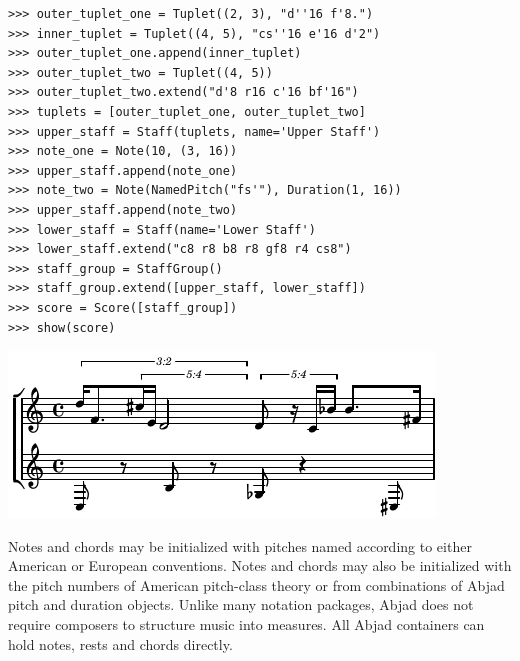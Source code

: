 \documentclass{article}
\begin{document}

\begin{lstlisting}
>>> outer_tuplet_one = Tuplet((2, 3), "d''16 f'8.")
>>> inner_tuplet = Tuplet((4, 5), "cs''16 e'16 d'2")
>>> outer_tuplet_one.append(inner_tuplet)
>>> outer_tuplet_two = Tuplet((4, 5))
>>> outer_tuplet_two.extend("d'8 r16 c'16 bf'16")
>>> tuplets = [outer_tuplet_one, outer_tuplet_two]
>>> upper_staff = Staff(tuplets, name='Upper Staff')
>>> note_one = Note(10, (3, 16))
>>> upper_staff.append(note_one)
>>> note_two = Note(NamedPitch("fs'"), Duration(1, 16))
>>> upper_staff.append(note_two)
>>> lower_staff = Staff(name='Lower Staff')
>>> lower_staff.extend("c8 r8 b8 r8 gf8 r4 cs8")
>>> staff_group = StaffGroup()
>>> staff_group.extend([upper_staff, lower_staff])
>>> score = Score([staff_group])
>>> show(score)
\end{lstlisting}
\noindent\includegraphics{assets/lilypond-45865c9ff19c72c1c9f7a6f4234e8546.pdf}

\noindent Notes and
chords may be initialized with pitches named according to either American or
European conventions. Notes and chords may also be initialized with the pitch numbers of American pitch-class theory or
from combinations of Abjad pitch and duration objects.
Unlike many notation packages, Abjad does not
require composers to structure music into measures. All Abjad containers
can hold notes, rests and chords directly.
\end{document}
